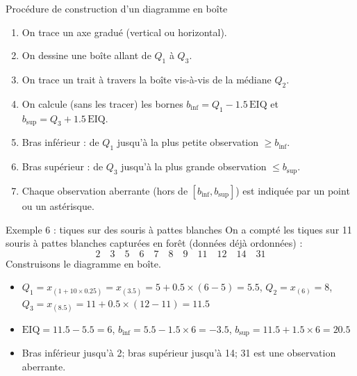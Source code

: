 \documentclass{BeamerTemplate}
\begin{document}
\begin{frame}[t]{Procédure de construction d'un diagramme en boîte}
  \begin{enumerate}\itemsep 1.5mm
    \item On trace un axe gradué (vertical ou horizontal).
    \item On dessine une boîte allant de $Q_1$ à $Q_3$.
    \item On trace un trait à travers la boîte vis-à-vis de la médiane $Q_2$.
    \item On \alert{calcule} (sans les tracer) les bornes
      $b_{\text{inf}} = Q_1 - 1.5\,\text{EIQ}$ et
      $b_{\text{sup}} = Q_3 + 1.5\,\text{EIQ}$.
    \item \alert{Bras inférieur} : de $Q_1$ jusqu'à la plus petite observation
      $\ge b_{\text{inf}}$.
    \item \alert{Bras supérieur} : de $Q_3$ jusqu'à la plus grande observation
      $\le b_{\text{sup}}$.
    \item Chaque observation aberrante (hors de $[b_{\text{inf}}, b_{\text{sup}}]$)
      est indiquée par un point ou un astérisque.
  \end{enumerate}
\end{frame}

\begin{frame}[t]{Exemple 6 : tiques sur des souris à pattes blanches}
  On a compté les tiques sur 11 souris à pattes blanches capturées en forêt
  (données déjà ordonnées) :
  \[ 2 \quad 3 \quad 5 \quad 6 \quad 7 \quad 8 \quad 9 \quad 11 \quad 12
     \quad 14 \quad 31 \]
  Construisons le diagramme en boîte.

  \begin{itemize}\itemsep 2mm
    \item<2-> $Q_1 = x_{(1 + 10 \times 0.25)} = x_{(3.5)} = 5 + 0.5 \times (6 - 5) = 5.5$,
      \quad $Q_2 = x_{(6)} = 8$,\\
      $Q_3 = x_{(8.5)} = 11 + 0.5 \times (12 - 11) = 11.5$
    \item<2-> $\text{EIQ} = 11.5 - 5.5 = 6$, \quad
      $b_{\text{inf}} = 5.5 - 1.5 \times 6 = -3.5$, \quad
      $b_{\text{sup}} = 11.5 + 1.5 \times 6 = 20.5$
    \item<3-> Bras inférieur jusqu'à 2; bras supérieur jusqu'à 14;
      \alert{31 est une observation aberrante}.
  \end{itemize}
\end{frame}
\end{document}
